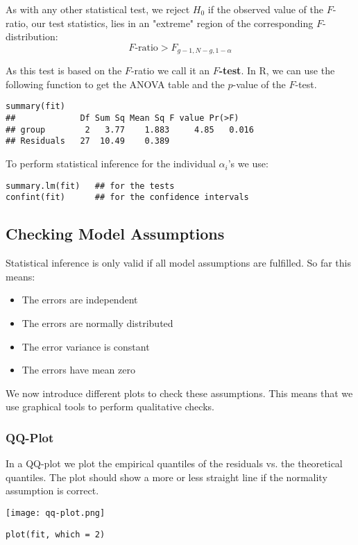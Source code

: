 As with any other statistical test, we reject $H_0$ if the observed value of the $F$-ratio, our test statistics, lies in an "extreme" region of the corresponding $F$-distribution:
$$F \text{-ratio} > F_{g-1, N-g, 1 - \alpha}$$

As this test is based on the $F$-ratio we call it an \textbf{$F$-test}. In R, we can use the following function to get the ANOVA table and the $p$-value of the $F$-test.
\begin{lstlisting}
summary(fit)
##             Df Sum Sq Mean Sq F value Pr(>F)
## group        2   3.77    1.883     4.85   0.016
## Residuals   27  10.49    0.389
\end{lstlisting}

To perform statistical inference for the individual $\alpha_i$'s we use:
\begin{lstlisting}
summary.lm(fit)   ## for the tests
confint(fit)      ## for the confidence intervals
\end{lstlisting}

\subsection{Checking Model Assumptions}

Statistical inference is only valid if all model assumptions are fulfilled. So far this means:
\begin{itemize}
	\item The errors are independent
	\item The errors are normally distributed
	\item The error variance is constant
	\item The errors have mean zero
\end{itemize}

We now introduce different plots to check these assumptions. This means that we use graphical tools to perform qualitative checks.

\subsubsection{QQ-Plot}

In a QQ-plot we plot the empirical quantiles of the residuals vs. the theoretical quantiles. The plot should show a more or less straight line if the normality assumption is correct.
\\[-20pt]
\begin{center}
	\texttt{[image: qq-plot.png]}
\end{center}
\begin{lstlisting}
plot(fit, which = 2)
\end{lstlisting}

